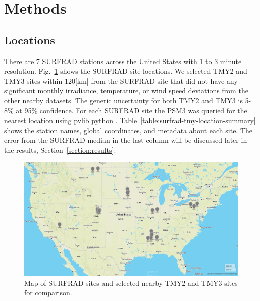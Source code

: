 \documentclass[conference]{IEEEtran}
\begin{document}
\section{Methods}
\subsection{Locations}
There are 7 SURFRAD stations \cite{Augustine2000} across the United States with 1 to 3 minute resolution. Fig.~\ref{fig:geojson-map} shows the SURFRAD site locations. We selected TMY2 \cite{Marion1995} and TMY3 \cite{Wilcox2012} sites within 120[km] from the SURFRAD site that did not have any significant monthly irradiance, temperature, or wind speed deviations from the other nearby datasets. The generic uncertainty for both TMY2 and TMY3 is 5-8\% at 95\% confidence. For each SURFRAD site the PSM3 was queried for the nearest location using pvlib python \cite{F.Holmgren2018}. Table~\ref{table:surfrad-tmy-location-summary} shows the station names, global coordinates, and metadata about each site. The error from the SURFRAD median in the last column will be discussed later in the results, Section~\ref{section:results}.

\begin{figure}[htbp]
\centerline{\includegraphics[width=18cm]{geojson.png}}
\caption{Map of SURFRAD sites and selected nearby TMY2 and TMY3 sites for comparison.}
\label{fig:geojson-map}
\end{figure}
\end{document}
